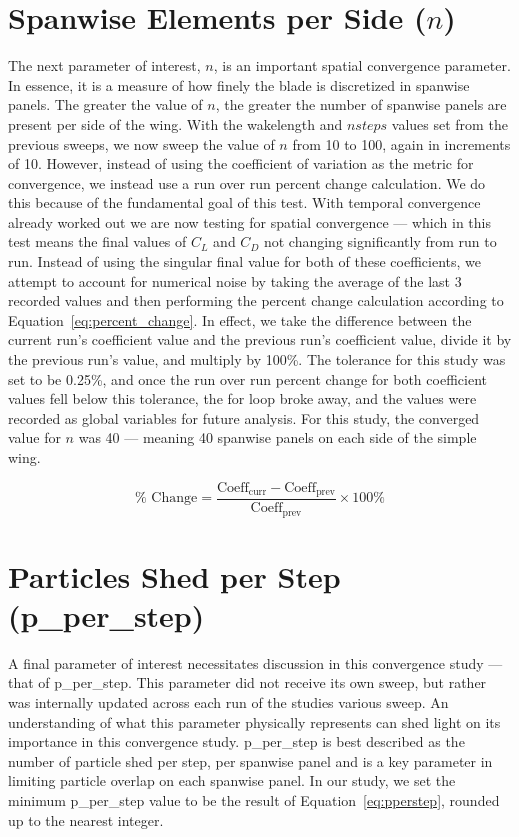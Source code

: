 \documentclass{report}
\begin{document}
\section{Spanwise Elements per Side (\texorpdfstring{$n$}{n})}
The next parameter of interest, $n$, is an important spatial convergence parameter. In essence, it is a measure of how finely the blade is discretized in spanwise panels.
The greater the value of $n$, the greater the number of spanwise panels are present per side of the wing.
With the wakelength and $nsteps$ values set from the previous sweeps, we now sweep the value of $n$ from 10 to 100, again in increments of 10.
However, instead of using the coefficient of variation as the metric for convergence, we instead use a run over run percent change calculation.
We do this because of the fundamental goal of this test. With temporal convergence already worked out we are now testing for spatial convergence --- which in this test means the final values of $C_L$ and $C_D$ not changing significantly from run to run.
Instead of using the singular final value for both of these coefficients, we attempt to account for numerical noise by taking the average of the last 3 recorded values and then performing the percent change calculation according to Equation~\ref{eq:percent_change}.
In effect, we take the difference between the current run's coefficient value and the previous run's coefficient value, divide it by the previous run's value, and multiply by 100\%.
The tolerance for this study was set to be 0.25\%, and once the run over run percent change for both coefficient values fell below this tolerance, the for loop broke away, and the values were recorded as global variables for future analysis.
For this study, the converged value for $n$ was 40 --- meaning 40 spanwise panels on each side of the simple wing.

\begin{equation}\label{eq:percent_change}
\% \text{ Change} = \frac{\text{Coeff}_{\text{curr}} - \text{Coeff}_{\text{prev}}}{\text{Coeff}_{\text{prev}}} \times{} 100\%
\end{equation}


\section{Particles Shed per Step (p\_per\_step)}
A final parameter of interest necessitates discussion in this convergence study --- that of p\_per\_step.
This parameter did not receive its own sweep, but rather was internally updated across each run of the studies various sweep.
An understanding of what this parameter physically represents can shed light on its importance in this convergence study.
p\_per\_step is best described as the number of particle shed per step, per spanwise panel and is a key parameter in limiting particle overlap on each spanwise panel.
In our study, we set the minimum p\_per\_step value to be the result of Equation~\ref{eq:pperstep}, rounded up to the nearest integer.
\end{document}
